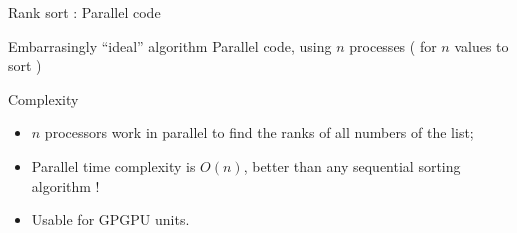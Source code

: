 \documentclass[compress,10pt,aspectratio=169]{beamer}
\begin{document}
\begin{frame}[fragile]{Rank sort : Parallel code}
  \scriptsize
  \begin{exampleblock}{Embarrasingly ``ideal'' algorithm} 
    Parallel code, using $n$ processes ( for $n$ values to sort )

    \begin{center}
    \end{center}
    \end{exampleblock}

  \begin{block}{Complexity}
    \begin{itemize}
    \item $n$ processors work in parallel to find the ranks of all numbers of the list;
    \item Parallel time complexity is $O(n)$, better than any sequential sorting algorithm !
    \item Usable for GPGPU units.
    \end{itemize}
  \end{block}
\end{frame}
\end{document}
